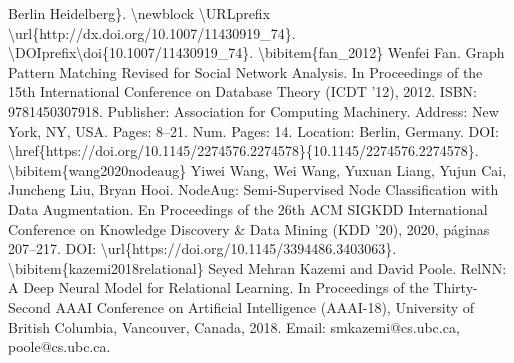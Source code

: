 \documentclass{article}%
\begin{document}
Berlin Heidelberg\}.\newline%
\textbackslash{}newblock \textbackslash{}URLprefix \textbackslash{}url\{http://dx.doi.org/10.1007/11430919\_74\}.\newline%
\textbackslash{}DOIprefix\textbackslash{}doi\{10.1007/11430919\_74\}.\newline%
\textbackslash{}bibitem\{fan\_2012\}\newline%
Wenfei Fan.\newline%
Graph Pattern Matching Revised for Social Network Analysis.\newline%
In Proceedings of the 15th International Conference on Database Theory (ICDT '12), 2012.\newline%
ISBN: 9781450307918.\newline%
Publisher: Association for Computing Machinery.\newline%
Address: New York, NY, USA.\newline%
Pages: 8–21.\newline%
Num. Pages: 14.\newline%
Location: Berlin, Germany.\newline%
DOI: \textbackslash{}href\{https://doi.org/10.1145/2274576.2274578\}\{10.1145/2274576.2274578\}.\newline%
\newline%
\textbackslash{}bibitem\{wang2020nodeaug\}\newline%
Yiwei Wang, Wei Wang, Yuxuan Liang, Yujun Cai, Juncheng Liu, Bryan Hooi.\newline%
NodeAug: Semi{-}Supervised Node Classification with Data Augmentation.\newline%
En Proceedings of the 26th ACM SIGKDD International Conference on Knowledge Discovery \& Data Mining (KDD '20), 2020, páginas 207–217.\newline%
DOI: \textbackslash{}url\{https://doi.org/10.1145/3394486.3403063\}.\newline%
\newline%
\textbackslash{}bibitem\{kazemi2018relational\}\newline%
Seyed Mehran Kazemi and David Poole.\newline%
RelNN: A Deep Neural Model for Relational Learning.\newline%
In Proceedings of the Thirty{-}Second AAAI Conference on Artificial Intelligence (AAAI{-}18), University of British Columbia, Vancouver, Canada, 2018.\newline%
Email: smkazemi@cs.ubc.ca, poole@cs.ubc.ca.\newline%
\end{document}
